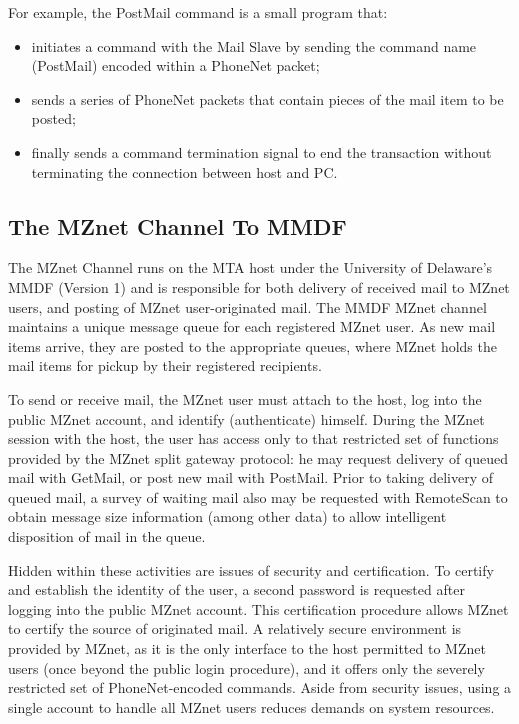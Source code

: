 For example, the PostMail command is a small program that:
\medskip
\begin{itemize}
\item initiates a command with the Mail Slave by sending the command
name (PostMail) encoded within a PhoneNet packet;
\item sends a series of PhoneNet packets that contain pieces of
the mail item to be posted; 
\item finally sends a command termination signal to end
the transaction without
terminating the connection between host and PC.
\end{itemize}

\subsection*	{The MZnet Channel To MMDF}
The MZnet Channel runs on the MTA host under the University of Delaware's
MMDF (Version 1) and is responsible for both delivery of received mail
to MZnet users, and posting of MZnet user-originated mail.
The MMDF MZnet channel maintains a unique message queue for each
registered MZnet user.
As new mail items arrive,
they are posted to the appropriate queues,
where MZnet holds the mail items for pickup by their registered
recipients.

To send or receive mail,
the MZnet user must attach to the host,
log into the public MZnet account,
and identify (authenticate) himself.
During the MZnet session with the host,
the user has access only to that restricted set of functions
provided by the MZnet split gateway protocol:
he may request delivery of queued mail with GetMail,
or post new mail with PostMail.
Prior to taking delivery of queued mail,
a survey of waiting mail also may be requested with RemoteScan to obtain
message size information (among other data)
to allow intelligent disposition 
of mail in the queue.

Hidden within these activities are issues of security and certification.
To certify and establish the identity of the user,
a second password is requested after logging into the 
public MZnet account.
This certification procedure allows MZnet to certify the source
of originated mail.
A relatively secure environment is provided by MZnet,
as it is the only interface to the host permitted to MZnet users
(once beyond the public login procedure),
and it offers only the severely restricted set of
PhoneNet-encoded commands.
Aside from security issues,
using a single account to handle all MZnet users
reduces demands on system resources.

